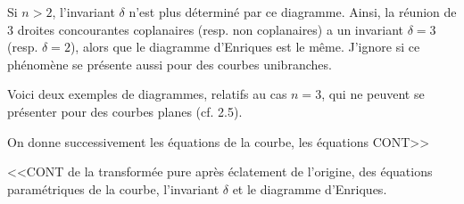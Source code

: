 \begin{center}
\end{center}
Si $n > 2$, l'invariant $\delta$ n'est plus déterminé par ce diagramme. Ainsi, la réunion de 3 droites concourantes coplanaires (resp. non coplanaires) a un invariant $\delta = 3$ (resp. $\delta = 2$), alors que le diagramme d'Enriques est le même. J'ignore si ce phénomène se présente aussi pour des courbes unibranches.

Voici deux exemples de diagrammes, relatifs au cas $n = 3$, qui ne peuvent se présenter pour des courbes planes (cf. 2.5).

On donne successivement les équations de la courbe, les équations CONT>>



<<CONT de la transformée pure après éclatement de l'origine, des équations paramétriques de la courbe, l'invariant $\delta$ et le diagramme d'Enriques.

